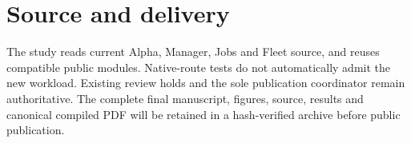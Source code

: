 \documentclass[11pt]{article}
\begin{document}
\section*{Source and delivery}
The study reads current Alpha, Manager, Jobs and Fleet source, and reuses compatible public modules. Native-route tests do not automatically admit the new workload. Existing review holds and the sole publication coordinator remain authoritative. The complete final manuscript, figures, source, results and canonical compiled PDF will be retained in a hash-verified archive before public publication.
\end{document}
